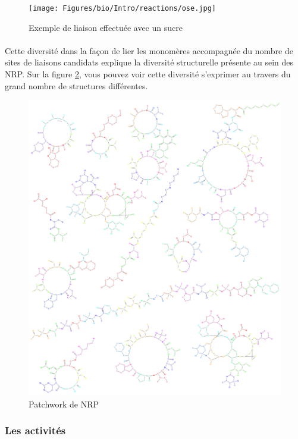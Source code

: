 \documentclass[12pt,french,twoside]{report}
\begin{document}
\begin{figure}[h!]
  \begin{center}
    \texttt{[image: Figures/bio/Intro/reactions/ose.jpg]}
    \caption{\label{ose}Exemple de liaison effectuée avec un sucre}
  \end{center}
\end{figure}

\paragraph{}Cette diversité dans la façon de lier les monomères accompagnée du nombre de sites de liaisons candidats explique la diversité structurelle présente au sein des NRP.
Sur la figure \ref{peps_example}, vous pouvez voir cette diversité s'exprimer au travers du grand nombre de structures différentes.

\begin{figure}[h!]
  \begin{center}
    \includegraphics[width=450px]{Figures/bio/Intro/NRPs/peps.png}
    \caption{\label{peps_example}Patchwork de NRP}
  \end{center}
\end{figure}


\subsubsection{Les activités}
\end{document}
